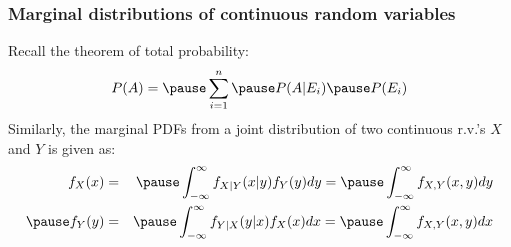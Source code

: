 \documentclass[usenames,dvipsnames,smaller]{beamer}
\newcommand{\lt}{\left}
\newcommand{\rt}{\right}
\newcommand{\?}{\stackrel{?}{=}}
\newcommand{\fr}{\frac}
\begin{document}
\begin{frame}
  \frametitle{Marginal distributions of continuous random variables} \pause
  Recall the theorem of total probability:\pause
  \begin{equation}
    \label{eq:12}
    P(A) = \pause \sum_{i=1}^n \pause P(A|E_i) \pause P(E_i)
  \end{equation}
  \pause
  Similarly, the marginal PDFs from a joint distribution of two continuous r.v.'s $X$ and $Y$ is given as:\pause
  \begin{eqnarray}
    f_X(x) &=& \pause \int_{-\infty}^\infty f_{X|Y}(x|y)f_Y(y)dy =\pause \int_{-\infty}^\infty f_{X,Y}(x,y)dy \\ \pause
    f_Y(y) &=&\pause \int_{-\infty}^\infty f_{Y|X}(y|x)f_X(x)dx =\pause  \int_{-\infty}^\infty f_{X,Y}(x,y)dx
  \end{eqnarray}
\end{frame}


    
\end{document}

